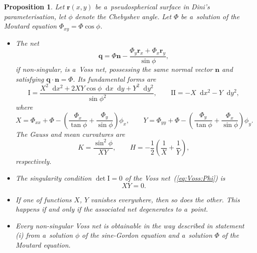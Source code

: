 \documentclass[pdftex]{sigma}
\let\ve\mathbf
\def\eqref#1{{\rm(\ref{#1})}}
\def\dif{\mathop{}\!\mathrm d}
\numberwithin{equation}{section}
\newtheorem{Proposition}[Theorem]{Proposition}
\theoremstyle{definition}
\begin{document}
\begin{Proposition}
\label{VsG->Voss}
Let $\ve r(x,y)$ be a~pseudospherical surface in Dini's parameterisation,
let $\phi$ denote the Chebyshev angle.
Let $\Phi$ be a~solution of the Moutard equation
$\Phi_{xy} = \Phi \cos\phi$.
\begin{itemize}
\itemsep=0pt
\item[$(i)$]
The net
\begin{equation}
\label{eq:Voss:Phi}
\ve q = \Phi \ve n
 - \frac{\Phi_{y} \ve r_{x} + \Phi_{x} \ve r_{y}}{\sin\phi},
\end{equation}
if non-singular, is a~Voss net, possessing the same normal vector $\ve n$
and satisfying $\ve q \cdot \ve n = \Phi$.
Its fundamental forms are
\begin{equation}
\label{eq:Voss:FF}
\mathrm{I} = \frac{X^2 \dif x^2 + 2 X Y \cos\phi \dif x \dif y +Y^2 \dif y^2}
 {\sin\phi^2},
\qquad
\mathrm{II} = -X \dif x^2 - Y \dif y^2,
\end{equation}
where
\begin{equation}
\label{eq:Phi:XY}
X = \Phi_{xx} + \Phi
 - \left(\frac{\Phi_x}{\tan\phi} + \frac{\Phi_y}{\sin\phi}\right) \phi_x,
\qquad
Y = \Phi_{yy} + \Phi
 - \left(\frac{\Phi_y}{\tan\phi} + \frac{\Phi_x}{\sin \phi}\right) \phi_y.
\end{equation}
The Gauss and mean curvatures are
\[
K = \frac{\sin^2\phi}{X Y}, \qquad
H = -\frac 1 2\left(\frac 1X + \frac 1Y\right),
\]
respectively.

\item[$(ii)$]
The singularity condition $\det\mathrm{I} = 0$ of the Voss
net~\eqref{eq:Voss:Phi}
is
\begin{equation}
\label{eq:Phi:sing}
X Y = 0.
\end{equation}

\item[$(iii)$]
If one of functions $X$, $Y$ vanishes everywhere,
then so does the other.
This happens if and only if the associated net degenerates to a~point.

\item[$(iv)$]
Every non-singular Voss net is obtainable in the way described in
statement {\rm(i)}
from a~solution $\phi$ of the sine-Gordon equation
and a~solution $\Phi$ of the Moutard equation.
\end{itemize}
\end{Proposition}
\end{document}

